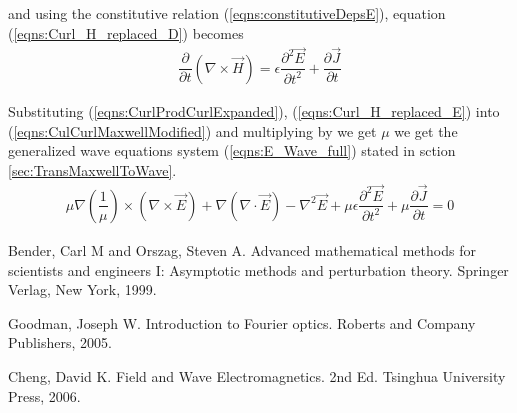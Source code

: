 \documentclass[twocolumn,secnumarabic,amssymb, nobibnotes, aps, prd]{revtex4-1}
\begin{document}
and using the constitutive relation (\ref{eqns:constitutiveDepsE}), equation (\ref{eqns:Curl_H_replaced_D}) becomes
\begin{align}
\label{eqns:Curl_H_replaced_E}
\dfrac{\partial}{\partial t} \left( \nabla \times \overrightarrow{H}\right) = \epsilon\dfrac{\partial^2 \overrightarrow{E}}{\partial t^2} + \dfrac{\partial \overrightarrow{J}}{\partial t}
\end{align}

Substituting (\ref{eqns:CurlProdCurlExpanded}), (\ref{eqns:Curl_H_replaced_E}) into (\ref{eqns:CulCurlMaxwellModified}) and multiplying by we get $\mu$ we get the generalized wave equations system (\ref{eqns:E_Wave_full}) stated in sction \ref{sec:TransMaxwellToWave}. 
\begin{align}
\mu \nabla \left( \dfrac{1}{\mu} \right) \times \left(\nabla \times \overrightarrow{E} \right) +  \nabla (\nabla \cdot \overrightarrow{E}) - \nabla^2 \overrightarrow{E} + \mu \epsilon\dfrac{\partial^2 \overrightarrow{E}}{\partial t^2} + \mu \dfrac{\partial \overrightarrow{J}}{\partial t} = 0
\end{align}







%

\begin{thebibliography}{2d}

Bender, Carl M and Orszag, Steven A. Advanced mathematical methods for scientists and engineers I: Asymptotic methods and perturbation theory. Springer Verlag, New York, 1999.

Goodman, Joseph W. Introduction to Fourier optics. Roberts and Company Publishers, 2005.

Cheng, David K. Field and Wave Electromagnetics. 2nd Ed. Tsinghua University Press, 2006.



  


\end{thebibliography}


%	
%
%
%

%
%
%
\end{document}
